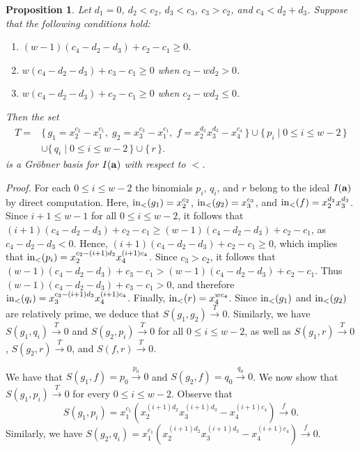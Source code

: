 \documentclass[10pt]{amsart}
\newtheorem{prop1}[thm1]{Proposition}
\begin{document}
\begin{prop1} \label{CMBasic12} Let $d_1=0$, $d_{2}<c_{2}$, $d_{3}<c_{3}$, $c_3>c_2$, and $c_4<d_{2}+d_{3}$. Suppose that the following conditions hold:
\begin{enumerate} \item $(w-1)(c_{4}-d_{2}-d_{3})+c_{2}-c_{1} \geq 0$.
\item $w(c_{4}-d_{2}-d_{3})+c_{3}-c_{1} \geq 0$ when $c_{2}-wd_{2}> 0$.
\item $w(c_{4}-d_{2}-d_{3})+c_{2}-c_{1} \geq 0$ when $c_{2}-wd_{2} \leq 0$.
\end{enumerate}
Then the set \[
\begin{aligned}
T = {} & \{\, g_{1}=x_{2}^{c_2}-x_{1}^{c_1},\;
          g_{2}=x_{3}^{c_3}-x_{1}^{c_1},\;
          f=x_{2}^{d_2}x_{3}^{d_3}-x_{4}^{c_4} \,\} \cup \{\, p_i \mid 0 \le i \le w-2 \,\} \\
      & 
        \cup \{\, q_i \mid 0 \le i \le w-2 \,\}
        \cup \{\, r \,\}.
\end{aligned}
\]
is a Gr\"obner basis for $I({\bf a})$ with respect to $<$.
\end{prop1}

{\em \noindent Proof.} For each $0 \leq i \leq w-2$ the binomials $p_{i}$, $q_{i}$, and $r$ belong to the ideal $I({\bf a})$ by direct computation. Here, ${\rm in}_{<}(g_{1})=x_{2}^{c_{2}}$, ${\rm in}_{<}(g_{2})=x_{3}^{c_{3}}$, and ${\rm in}_{<}(f)=x_{2}^{d_{2}}x_{3}^{d_{3}}$. Since $i+1 \leq w-1$ for all $0 \leq i \leq w-2$, it follows that $(i+1)(c_{4}-d_{2}-d_{3})+c_{2}-c_{1} \geq (w-1)(c_{4}-d_{2}-d_{3})+c_{2}-c_{1}$, as $c_{4}-d_{2}-d_{3}<0$. Hence, $(i+1)(c_{4}-d_{2}-d_{3})+c_{2}-c_{1} \geq 0$, which implies that ${\rm in}_{<}(p_{i})=x_{2}^{c_{2}-(i+1)d_{2}}x_{4}^{(i+1)c_{4}}$. Since $c_3>c_2$, it follows that $(w-1)(c_{4}-d_{2}-d_{3})+c_{3}-c_{1}>(w-1)(c_{4}-d_{2}-d_{3})+c_{2}-c_{1}$. Thus $(w-1)(c_{4}-d_{2}-d_{3})+c_{3}-c_{1} >0$, and therefore ${\rm in}_{<}(q_{i})=x_{3}^{c_{3}-(i+1)d_3}x_{4}^{(i+1)c_{4}}$. Finally, ${\rm in}_{<}(r)=x_{4}^{wc_4}$. Since ${\rm in}_{<}(g_{1})$ and ${\rm in}_{<}(g_{2})$ are relatively prime, we deduce that $S(g_{1},g_{2}) \stackrel{T} {\longrightarrow} 0$. Similarly, we have $S(g_{1},q_{i}) \stackrel{T} {\longrightarrow} 0$ and $S(g_{2},p_i) \stackrel{T} {\longrightarrow} 0$ for all $0 \leq i \leq w-2$, as well as $S(g_{1},r) \stackrel{T} {\longrightarrow} 0$, $S(g_{2},r) \stackrel{T} {\longrightarrow} 0$, and $S(f,r) \stackrel{T} {\longrightarrow} 0$. 

We have that $S(g_{1},f)=p_{0} \stackrel{p_{0}} {\longrightarrow} 0$ and $S(g_{2},f)=q_{0} \stackrel{q_{0}} {\longrightarrow} 0$. We now show that $S(g_{1}, p_{i}) \stackrel{T}{\longrightarrow} 0$ for every $0 \leq i \leq w-2$. Observe that $$S(g_{1},p_{i})=x_{1}^{c_1}(x_{2}^{(i+1)d_2}x_{3}^{(i+1)d_3}-x_{4}^{(i+1)c_4}) \stackrel{f} {\longrightarrow} 0.$$ Similarly, we have $S(g_{2},q_{i})=x_{1}^{c_1}(x_{2}^{(i+1)d_2}x_{3}^{(i+1)d_3}-x_{4}^{(i+1)c_4}) \stackrel{f} {\longrightarrow} 0.$ 
\end{document}
